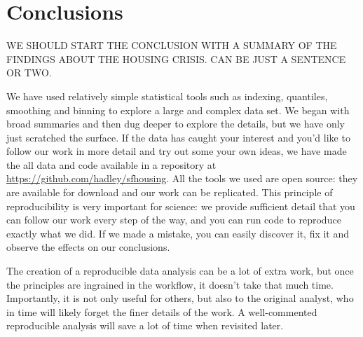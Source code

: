 \documentclass[oneside]{article}
\begin{document}
\section{Conclusions}


WE SHOULD START THE CONCLUSION WITH A SUMMARY OF THE FINDINGS ABOUT THE HOUSING CRISIS. CAN BE JUST A SENTENCE OR TWO.

We have used relatively simple statistical tools such as indexing, quantiles, smoothing and binning to explore a large and complex data set.  We began with broad summaries and then dug deeper to explore the details, but we have only just scratched the surface.  If the data has caught your interest and you'd like to follow our work in more detail and try out some your own ideas, we have made the all data and code available in a repository at \url{https://github.com/hadley/sfhousing}.  All the tools we used are open source: they are available for download and our work can be replicated. This principle of reproducibility \citep{gentleman:2007} is very important for science: we provide sufficient detail that you can follow our work every step of the way, and you can run code to reproduce exactly what we did.  If we made a mistake, you can easily discover it, fix it and observe the effects on our conclusions.  

The creation of a reproducible data analysis can be a lot of extra work, but once the principles are ingrained in the workflow, it doesn't take that much time.  Importantly, it is not only useful for others, but also to the original analyst, who in time will likely forget the finer details of the work. A well-commented reproducible analysis will save a lot of time when revisited later.
\end{document}
